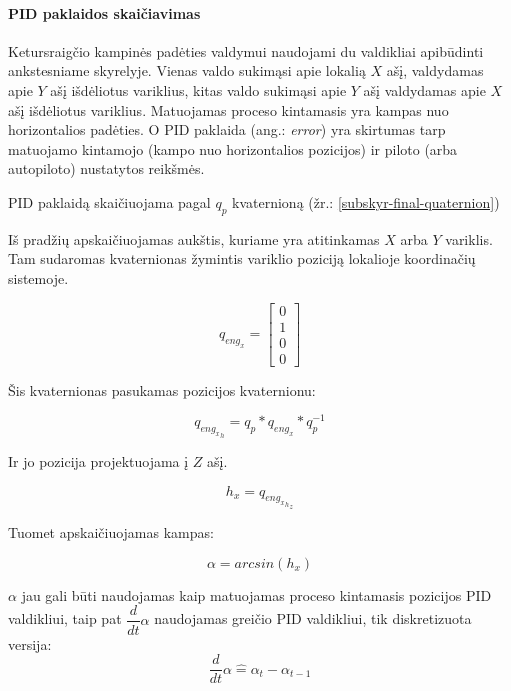 \documentclass[12pt, a4paper, lithuanian, final]{article}
\begin{document}
\paragraph{PID paklaidos skaičiavimas}
Ketursraigčio kampinės padėties valdymui naudojami du valdikliai apibūdinti ankstesniame skyrelyje.
Vienas valdo sukimąsi apie lokalią $X$ ašį, valdydamas apie $Y$ ašį išdėliotus variklius, kitas valdo sukimąsi apie $Y$ ašį valdydamas apie $X$ ašį išdėliotus variklius.
Matuojamas proceso kintamasis yra kampas nuo horizontalios padėties.
O PID paklaida (ang.: \textit{error}) yra skirtumas tarp matuojamo kintamojo (kampo nuo horizontalios pozicijos) ir piloto (arba autopiloto) nustatytos reikšmės.

PID paklaidą skaičiuojama pagal $q_p$ kvaternioną (žr.: \ref{subskyr-final-quaternion})

Iš pradžių apskaičiuojamas aukštis, kuriame yra atitinkamas $X$ arba $Y$ variklis.
Tam sudaromas kvaternionas žymintis variklio poziciją lokalioje koordinačių sistemoje.

\begin{equation}
	q_{eng_x} = \left[
		\begin{array}{c}
			0 \\
			1 \\
			0 \\
			0
		\end{array}
	\right]
\end{equation}

Šis kvaternionas pasukamas pozicijos kvaternionu:

\begin{equation}
	q_{{eng_x}_h} = q_p * q_{eng_x} * q_p^{-1}
\end{equation}

Ir jo pozicija projektuojama į $Z$ ašį.

\begin{equation}
	h_x = q_{{{eng_x}_h}_z}
\end{equation}

Tuomet apskaičiuojamas kampas:

\begin{equation}
	\alpha = arcsin(h_x)
\end{equation}

$\alpha$ jau gali būti naudojamas kaip matuojamas proceso kintamasis pozicijos PID valdikliui, taip pat $\dfrac{d}{dt}\alpha$ naudojamas greičio PID valdikliui, tik diskretizuota versija:
\begin{equation}
	\dfrac{d}{dt}\alpha \widehat{=} \alpha_t - \alpha_{t-1}
\end{equation}
\end{document}
